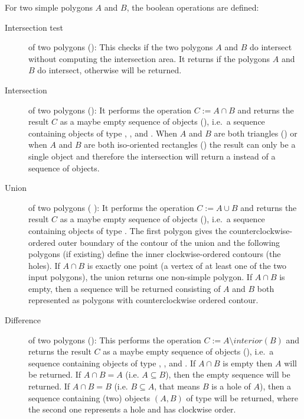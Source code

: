 For two simple polygons $A$ and $B$, the boolean operations are
defined:
\begin{description}

\item [Intersection test] of two polygons ():
   This checks if the two polygons $A$ and $B$ do intersect without computing
      the intersection area.      
     It returns  if the polygons $A$ and $B$ do intersect,
      otherwise  will be returned.

\item [Intersection] of two polygons ():
   It performs the operation $C:=A \cap B$ and returns the result $C$
      as a maybe empty sequence of objects (),
      i.e.\ a sequence containing objects of type ,
      , and .
      When $A$ and $B$ are both triangles () 
      or when $A$ 
      and $B$ are both iso-oriented rectangles
      () the result can
      only be a single object and therefore the intersection will return
      a  instead of a sequence of objects.

\item [Union] of two polygons ( ): It
    performs the operation $C:=A \cup B$ and returns the result $C$ as
    a maybe empty sequence of objects (), i.e.\ a
    sequence containing objects of type .  The
    first polygon gives the counterclockwise-ordered outer boundary of
    the contour of the union and the following polygons (if existing)
    define the inner clockwise-ordered contours (the holes).  If $A
    \cap B$ is exactly one point (a vertex of at least one of the two
    input polygons), the union returns one non-simple polygon.  If $A
    \cap B$ is empty, then a sequence will be returned consisting of $A$
    and $B$ both represented as polygons with counterclockwise ordered
    contour.
 
\item [Difference] of two polygons ():
  This    performs the operation $C:=A \setminus interior(B)$ and
      returns the result $C$
      as a maybe empty sequence of objects (),
      i.e.\ a sequence containing objects of type ,
      , and .
      If $A \cap B$ is empty 
         then $A$ will be returned.
      If $A \cap B = A$ (i.e. $A \subseteq B$),
         then the empty sequence will be returned.
      If $A \cap B = B$ (i.e. $B \subseteq A$, that means $B$ is a 
         hole of $A$),
         then a sequence containing (two) objects $(A,B)$ of type
          will be returned, where the second one
         represents a hole and has clockwise order.
\end{description}

